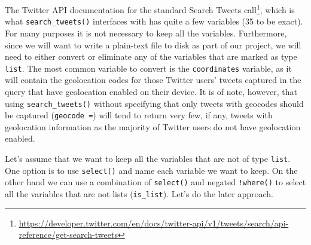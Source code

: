 \documentclass[
]{article}
\DeclareRobustCommand{\href}[2]{#2\footnote{\url{#1}}}
\begin{document}
The \href{https://developer.twitter.com/en/docs/twitter-api/v1/tweets/search/api-reference/get-search-tweets}{Twitter API documentation for the standard Search Tweets call}, which is what \texttt{search\_tweets()} interfaces with has quite a few variables (35 to be exact). For many purposes it is not necessary to keep all the variables. Furthermore, since we will want to write a plain-text file to disk as part of our project, we will need to either convert or eliminate any of the variables that are marked as type \texttt{list}. The most common variable to convert is the \texttt{coordinates} variable, as it will contain the geolocation codes for those Twitter users' tweets captured in the query that have geolocation enabled on their device. It is of note, however, that using \texttt{search\_tweets()} without specifying that only tweets with geocodes should be captured (\texttt{geocode\ =}) will tend to return very few, if any, tweets with geolocation information as the majority of Twitter users do not have geolocation enabled.

Let's assume that we want to keep all the variables that are not of type \texttt{list}. One option is to use \texttt{select()} and name each variable we want to keep. On the other hand we can use a combination of \texttt{select()} and negated \texttt{!where()} to select all the variables that are not lists (\texttt{is\_list}). Let's do the later approach.
\end{document}
